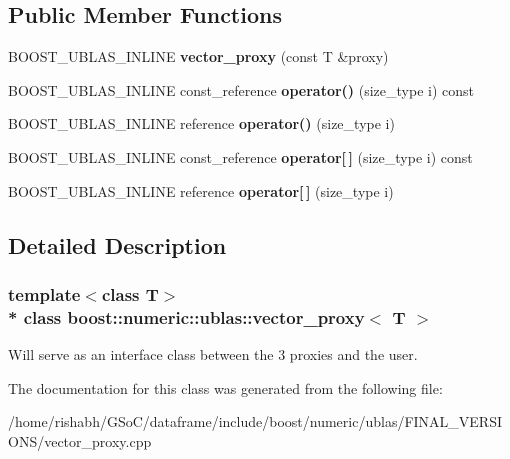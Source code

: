 \subsection*{Public Member Functions}
\begin{DoxyCompactItemize}
\item 
B\+O\+O\+S\+T\+\_\+\+U\+B\+L\+A\+S\+\_\+\+I\+N\+L\+I\+NE {\bfseries vector\+\_\+proxy} (const T \&proxy)\hypertarget{classboost_1_1numeric_1_1ublas_1_1vector__proxy_a87a4e164cb0aabffe0a669e2d3402334}{}\label{classboost_1_1numeric_1_1ublas_1_1vector__proxy_a87a4e164cb0aabffe0a669e2d3402334}

\item 
B\+O\+O\+S\+T\+\_\+\+U\+B\+L\+A\+S\+\_\+\+I\+N\+L\+I\+NE const\+\_\+reference {\bfseries operator()} (size\+\_\+type i) const \hypertarget{classboost_1_1numeric_1_1ublas_1_1vector__proxy_ae223ea8592ed602a4b88dbd415d6e7e2}{}\label{classboost_1_1numeric_1_1ublas_1_1vector__proxy_ae223ea8592ed602a4b88dbd415d6e7e2}

\item 
B\+O\+O\+S\+T\+\_\+\+U\+B\+L\+A\+S\+\_\+\+I\+N\+L\+I\+NE reference {\bfseries operator()} (size\+\_\+type i)\hypertarget{classboost_1_1numeric_1_1ublas_1_1vector__proxy_a379938d003ee0f932580fbf9308a6f96}{}\label{classboost_1_1numeric_1_1ublas_1_1vector__proxy_a379938d003ee0f932580fbf9308a6f96}

\item 
B\+O\+O\+S\+T\+\_\+\+U\+B\+L\+A\+S\+\_\+\+I\+N\+L\+I\+NE const\+\_\+reference {\bfseries operator\mbox{[}$\,$\mbox{]}} (size\+\_\+type i) const \hypertarget{classboost_1_1numeric_1_1ublas_1_1vector__proxy_af47140a63c9999608e73acf222267d2e}{}\label{classboost_1_1numeric_1_1ublas_1_1vector__proxy_af47140a63c9999608e73acf222267d2e}

\item 
B\+O\+O\+S\+T\+\_\+\+U\+B\+L\+A\+S\+\_\+\+I\+N\+L\+I\+NE reference {\bfseries operator\mbox{[}$\,$\mbox{]}} (size\+\_\+type i)\hypertarget{classboost_1_1numeric_1_1ublas_1_1vector__proxy_aacfba4abc73d10325c2b0f832ee99259}{}\label{classboost_1_1numeric_1_1ublas_1_1vector__proxy_aacfba4abc73d10325c2b0f832ee99259}

\end{DoxyCompactItemize}


\subsection{Detailed Description}
\subsubsection*{template$<$class T$>$\\*
class boost\+::numeric\+::ublas\+::vector\+\_\+proxy$<$ T $>$}

Will serve as an interface class between the 3 proxies and the user. 

The documentation for this class was generated from the following file\+:\begin{DoxyCompactItemize}
\item 
/home/rishabh/\+G\+So\+C/dataframe/include/boost/numeric/ublas/\+F\+I\+N\+A\+L\+\_\+\+V\+E\+R\+S\+I\+O\+N\+S/vector\+\_\+proxy.\+cpp\end{DoxyCompactItemize}
